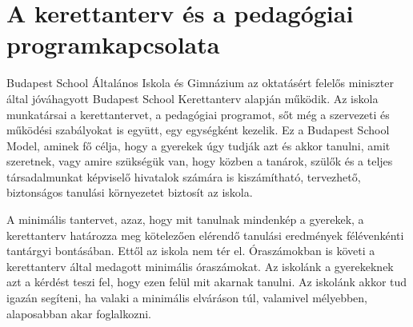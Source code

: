 \section{A kerettanterv és a pedagógiai program\hfill\break  kapcsolata}
\label{sec:tanterv-program}
Budapest School Általános Iskola és Gimnázium az oktatásért felelős miniszter által jóváhagyott Budapest School Kerettanterv alapján működik. Az iskola munkatársai a kerettantervet, a pedagógiai programot, sőt még a szervezeti és működési szabályokat is együtt, egy egységként kezelik. Ez a Budapest School Model, aminek fő célja, hogy a gyerekek úgy tudják azt és akkor tanulni, amit szeretnek, vagy amire szükségük van, hogy közben a tanárok, szülők és a teljes társadalmunkat képviselő hivatalok számára is kiszámítható, tervezhető, biztonságos tanulási környezetet biztosít az iskola.

A minimális tantervet, azaz, hogy mit tanulnak mindenkép a gyerekek, a kerettanterv határozza meg kötelezően elérendő tanulási eredmények félévenkénti tantárgyi bontásában. Ettől az iskola nem tér el. Óraszámokban is követi a kerettanterv által medagott minimális óraszámokat. Az iskolánk a gyerekeknek azt a kérdést teszi fel, hogy ezen felül mit akarnak tanulni. Az iskolánk akkor tud igazán segíteni, ha valaki a minimális elváráson túl, valamivel mélyebben, alaposabban akar foglalkozni.
